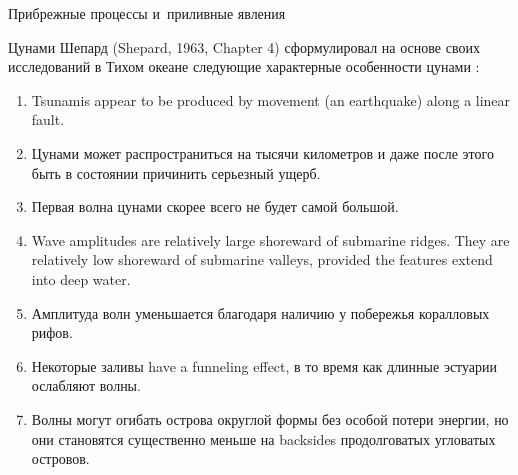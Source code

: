 \begin{chapter}{Прибрежные процессы и~приливные явления}
\begin{section}{Цунами}
Шепард (Shepard, 1963, Chapter 4) сформулировал на основе своих исследований
в Тихом океане следующие характерные особенности цунами%
:
%
%
\begin{enumerate}
\item
Tsunamis appear to be produced by movement (an earthquake) along a
linear fault.
%

\item 
Цунами может распространиться на тысячи километров и даже после этого
быть в состоянии причинить серьезный ущерб.
%

\item
Первая волна цунами скорее всего не будет самой большой.
%

\item
Wave amplitudes are relatively large shoreward of submarine
ridges. They are relatively low shoreward of submarine valleys,
provided the features extend into deep water.
%

\item
Амплитуда волн уменьшается благодаря наличию у побережья коралловых
рифов.
%

\item
Некоторые заливы have a funneling effect, 
в то время как длинные эстуарии ослабляют волны.
%

\item
Волны могут огибать острова округлой формы без особой потери энергии,
но они становятся существенно меньше на backsides продолговатых угловатых
островов.
%
\end{enumerate}


\end{section}
\end{chapter}
